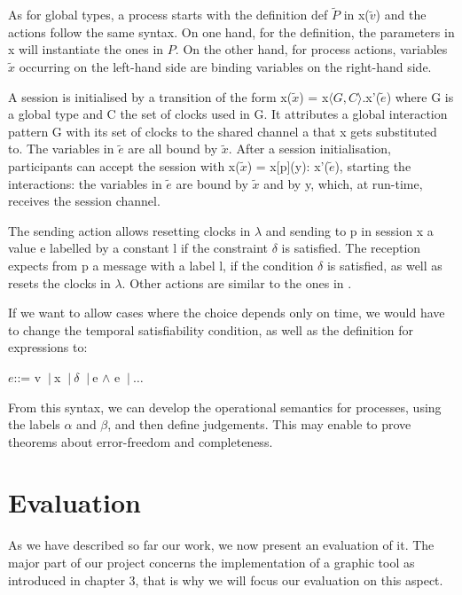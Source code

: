 \documentclass[a4paper,11pt,twoside]{report}
\newcommand{\PP}{\ensuremath{P}}
\newcommand{\e}{\ensuremath{e}}
\newcommand{\sep}{\ensuremath{~\mathbf{|}~ }}
\begin{document}
As for global types, a process starts with the definition def $\tilde{\PP}$ in x($\tilde{v}$) and the actions follow the same syntax. On one hand, for the definition, the parameters in x will instantiate the ones in \PP. On the other hand, for process actions, variables $\tilde{x}$ occurring on the left-hand side are binding variables on the right-hand side.

A session is initialised by a transition of the form x($\tilde{x}$) = x$\langle G, C \rangle$.x’($\tilde{e}$) where G is a global type and C the set of clocks used in G. It attributes a global interaction pattern G with its set of clocks to the shared channel a that x gets substituted to. The variables in $\tilde{e}$ are all bound by $\tilde{x}$. After a session initialisation, participants can accept the session with x($\tilde{x}$) = x[p](y): x’($\tilde{e}$), starting the interactions: the variables in $\tilde{e}$ are bound by $\tilde{x}$ and by y, which, at run-time, receives the session channel.

The sending action allows resetting clocks in $\lambda$ and sending to p in session x a value e labelled by a constant l if the constraint $\delta$ is satisfied. The reception expects from p a message with a label l, if the condition $\delta$ is satisfied, as well as resets the clocks in $\lambda$. Other actions are similar to the ones in \cite{denielou2012multiparty}. 

If we want to allow cases where the choice depends only on time, we would have to change the temporal satisfiability condition, as well as the definition for expressions to:
\begin{center}
\e  ::= v \sep x \sep $\delta$ \sep e $\wedge$ e \sep $\ldots$ 
\end{center}

From this syntax, we can develop the operational semantics for processes, using the labels $\alpha$ and $\beta$, and then define judgements. This may enable to prove theorems about error-freedom and completeness.



\chapter{Evaluation}
As we have described so far our work, we now present an evaluation of it. The major part of our project concerns the implementation of a graphic tool as introduced in chapter 3, that is why we will focus our evaluation on this aspect.
\end{document}
